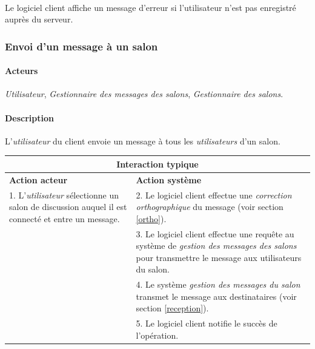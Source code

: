 \documentclass[a4paper]{article}
\begin{document}
    \paragraph{}Le logiciel client affiche un message d'erreur si l'utilisateur
    n'est pas enregistré auprès du serveur.

   \subsubsection{Envoi d'un message à un salon}

    \paragraph{Acteurs} \textit{Utilisateur},
    \textit{Gestionnaire des messages des salons},
    \textit{Gestionnaire des salons}.

    \paragraph{Description} L'\textit{utilisateur} du client envoie un message
    à tous les \textit{utilisateurs} d'un salon.

    \begin{center}
        \begin{tabular}{|p{6cm}|p{6cm}|}
            \hline
            \multicolumn{2}{|c|}{\textbf{Interaction typique}} \\ \hline
            \textbf{Action acteur} & \textbf{Action système} \\ \hline
            1. L'\textit{utilisateur} sélectionne un salon de discussion auquel
            il est connecté et entre un message.
            & 2. Le logiciel client effectue une
            \textit{correction orthographique} du message (voir section
            \ref{ortho}). \\
            & 3. Le logiciel client effectue une requête au système de
            \textit{gestion des messages des salons} pour transmettre le message
            aux utilisateurs du salon. \\
            & 4. Le système \textit{gestion des messages du salon} transmet le
            message aux destinataires (voir section \ref{reception}). \\
            & 5. Le logiciel client notifie le succès de l'opération. \\
            \hline
        \end{tabular}
    \end{center}
\end{document}
